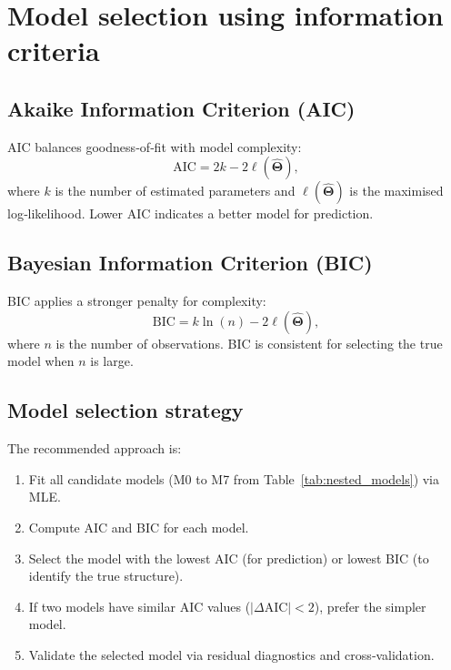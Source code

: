 \section{Model selection using information criteria}
\label{sec:model-selection}

\subsection{Akaike Information Criterion (AIC)}

AIC balances goodness‑of‑fit with model complexity:
\begin{equation}
\mathrm{AIC} = 2k - 2\ell(\hat{\boldsymbol{\Theta}}),
\end{equation}
where \(k\) is the number of estimated parameters and \(\ell(\hat{\boldsymbol{\Theta}})\) is the maximised log‑likelihood. Lower AIC indicates a better model for prediction.

\subsection{Bayesian Information Criterion (BIC)}

BIC applies a stronger penalty for complexity:
\begin{equation}
\mathrm{BIC} = k\ln(n) - 2\ell(\hat{\boldsymbol{\Theta}}),
\end{equation}
where \(n\) is the number of observations. BIC is consistent for selecting the true model when \(n\) is large.

\subsection{Model selection strategy}

The recommended approach is:
\begin{enumerate}
    \item Fit all candidate models (M0 to M7 from Table~\ref{tab:nested_models}) via MLE.
    \item Compute AIC and BIC for each model.
    \item Select the model with the lowest AIC (for prediction) or lowest BIC (to identify the true structure).
    \item If two models have similar AIC values (\(|\Delta\mathrm{AIC}| < 2\)), prefer the simpler model.
    \item Validate the selected model via residual diagnostics and cross‑validation.
\end{enumerate}

